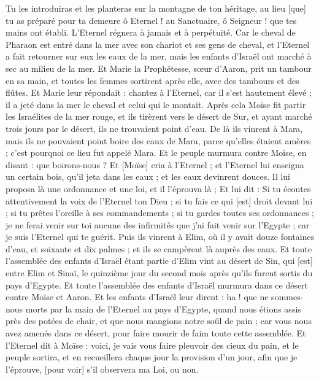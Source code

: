 \begin{multicols}{2}
Tu les introduiras et les planteras sur la montagne de ton héritage, au lieu [que] tu as préparé pour ta demeure ô Eternel ! au Sanctuaire, ô Seigneur ! que tes mains ont établi.
L'Eternel régnera à jamais et à perpétuité.
Car le cheval de Pharaon est entré dans la mer avec son chariot et ses gens de cheval, et l'Eternel a fait retourner sur eux les eaux de la mer, mais les enfants d'Israël ont marché à sec au milieu de la mer.
Et Marie la Prophétesse, sœur d'Aaron, prit un tambour en sa main, et toutes les femmes sortirent après elle, avec des tambours et des flûtes.
Et Marie leur répondait : chantez à l'Eternel, car il s'est hautement élevé ; il a jeté dans la mer le cheval et celui qui le montait.
Après cela Moïse fit partir les Israélites de la mer rouge, et ils tirèrent vers le désert de Sur, et ayant marché trois jours par le désert, ils ne trouvaient point d'eau.
De là ils vinrent à Mara, mais ils ne pouvaient point boire des eaux de Mara, parce qu'elles étaient amères ; c'est pourquoi ce lieu fut appelé Mara.
Et le peuple murmura contre Moïse, en disant : que boirons-nous ?
Et [Moïse] cria à l'Eternel ; et l'Eternel lui enseigna un certain bois, qu'il jeta dans les eaux ; et les eaux devinrent douces. Il lui proposa là une ordonnance et une loi, et il l'éprouva là ;
Et lui dit : Si tu écoutes attentivement la voix de l'Eternel ton Dieu ; si tu fais ce qui [est] droit devant lui ; si tu prêtes l'oreille à ses commandements ; si tu gardes toutes ses ordonnances ; je ne ferai venir sur toi aucune des infirmités que j'ai fait venir sur l'Egypte ; car je suis l'Eternel qui te guérit.
Puis ils vinrent à Elim, où il y avait douze fontaines d'eau, et soixante et dix palmes ; et ils se campèrent là auprès des eaux.
\VerseOne{}Et toute l'assemblée des enfants d'Israël étant partie d'Elim vint au désert de Sin, qui [est] entre Elim et Sinaï, le quinzième jour du second mois après qu'ils furent sortis du pays d'Egypte.
Et toute l'assemblée des enfants d'Israël murmura dans ce désert contre Moïse et Aaron.
Et les enfants d'Israël leur dirent : ha ! que ne sommes-nous morts par la main de l'Eternel au pays d'Egypte, quand nous étions assis près des potées de chair, et que nous mangions notre soûl de pain ; car vous nous avez amenés dans ce désert, pour faire mourir de faim toute cette assemblée.
Et l'Eternel dit à Moïse : voici, je vais vous faire pleuvoir des cieux du pain, et le peuple sortira, et en recueillera chaque jour la provision d'un jour, afin que je l'éprouve, [pour voir] s'il observera ma Loi, ou non.

\end{multicols}
